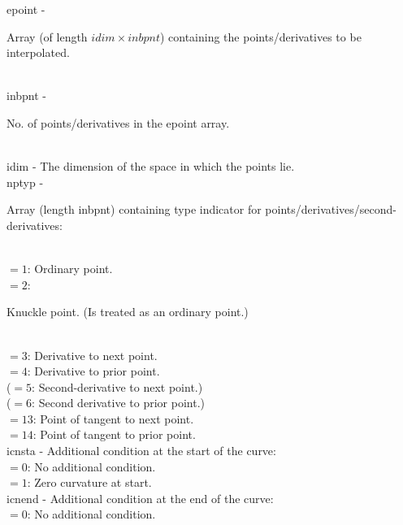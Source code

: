         \>\>    {\fov epoint}\> - \>
        \begin{minipg2}
          Array (of length $idim\times inbpnt$) containing the
          points/\-derivatives to be interpolated.
        \end{minipg2}\\
        \>\>    {\fov inbpnt}\> - \>
        \begin{minipg2}
          No. of points/\-derivatives in the {\fov epoint} array.
        \end{minipg2}\\
        \>\>    {\fov idim}\> - \>
        The dimension of the space in which the points lie.\\
        \>\>    {\fov nptyp}\> - \> \begin{minipg2}
                  Array (length {\fov inbpnt}) containing type indicator for
                  points/\-derivatives/\-second-derivatives:
                \end{minipg2}\\
                \>\>\>\> $=1$\>: Ordinary point.\\
                \>\>\>\> $=2$\>:
                \begin{minipg5}
                  Knuckle point.  (Is treated as an ordinary point.)
                \end{minipg5}\\
                \>\>\>\> $=3$\>: Derivative to next point.\\
                \>\>\>\> $=4$\>: Derivative to prior point.\\
                \>\>\>\> ($=5$\>: Second-derivative to next point.)\\
                \>\>\>\> ($=6$\>: Second derivative to prior point.)\\
                \>\>\>\> $=13$\>: Point of tangent to next point.\\
                \>\>\>\> $=14$\>: Point of tangent to prior  point.\\
\newpagetabs
        \>\>    {\fov icnsta}\> - \>
                Additional condition at the start of the curve:\\
                  \>\>\>\> $=0$\>: No additional condition.\\
                  \>\>\>\> $=1$\>: Zero curvature at start.\\
        \>\>    {\fov icnend}\> - \>
                Additional condition at the end of the curve:\\
                  \>\>\>\> $=0$\>: No additional condition.\\
